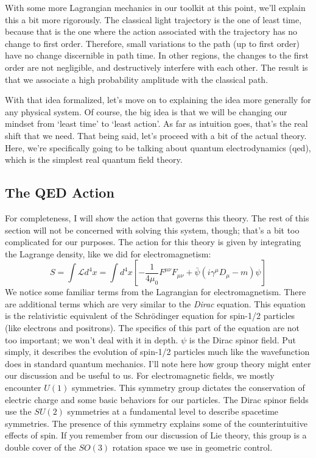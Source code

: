 With some more \gls{Lagrangian} mechanics in our toolkit at this point, we'll explain this a bit more rigorously. The classical light trajectory is the one of least time, because that is the one where the action associated with the trajectory has no change to first order. Therefore, small variations to the path (up to first order) have no change discernible in path time. In other regions, the changes to the first order are not negligible, and destructively interfere with each other. The result is that we associate a high probability amplitude with the classical path.

With that idea formalized, let's move on to explaining the idea more generally for any physical system. Of course, the big idea is that we will be changing our mindset from `least time' to `least action'. As far as intuition goes, that's the real shift that we need. That being said, let's proceed with a bit of the actual theory. Here, we're specifically going to be talking about quantum electrodynamics (\gls{qed}), which is the simplest real quantum field theory.

\subsection{The QED Action}

For completeness, I will show the action that governs this theory. The rest of this section will not be concerned with solving this system, though; that's a bit too complicated for our purposes. The action for this theory is given by integrating the Lagrange density, like we did for electromagnetism:
$$S=\int\mathcal{L}d^4x=\int d^4x\left[-\frac{1}{4\mu_0}F^{\mu\nu}F_{\mu\nu}+\bar{\psi}(i\gamma^\mu D_\mu-m)\psi\right]$$
We notice some familiar terms from the \gls{Lagrangian} for electromagnetism. There are additional terms which are very similar to the \textit{Dirac} equation. This equation is the relativistic equivalent of the Schr\"odinger equation for spin-1/2 particles (like electrons and positrons). The specifics of this part of the equation are not too important; we won't deal with it in depth. $\psi$ is the Dirac spinor field. Put simply, it describes the evolution of spin-1/2 particles much like the wavefunction does in standard quantum mechanics. I'll note here how group theory might enter our discussion and be useful to us. For electromagnetic fields, we mostly encounter $U(1)$ symmetries. This symmetry group dictates the conservation of electric charge and some basic behaviors for our particles. The Dirac spinor fields use the $SU(2)$ symmetries at a fundamental level to describe spacetime symmetries. The presence of this symmetry explains some of the counterintuitive effects of spin. If you remember from our discussion of Lie theory, this group is a double cover of the $SO(3)$ rotation space we use in geometric control.

